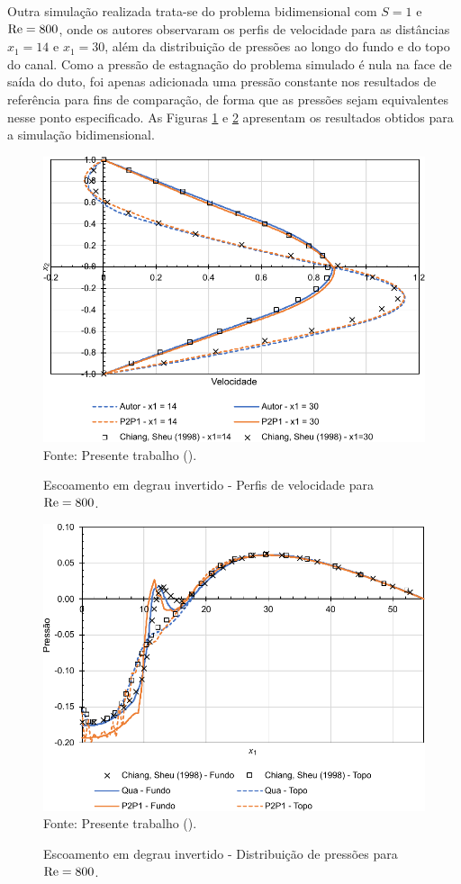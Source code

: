 Outra simulação realizada trata-se do problema bidimensional com $S=1$ e $\mathrm{Re}=800$, onde os autores observaram os perfis de velocidade para as distâncias $x_1=14$ e $x_1=30$, além da distribuição de pressões ao longo do fundo e do topo do canal. Como a pressão de estagnação do problema simulado é nula na face de saída do duto, foi apenas adicionada uma pressão constante nos resultados de referência para fins de comparação, de forma que as pressões sejam equivalentes nesse ponto especificado. As Figuras \ref{fig:BFS800-vel} e \ref{fig:BFS800-pre} apresentam os resultados obtidos para a simulação bidimensional.

\begin{figure}[h!]
    \centering
    \caption{Escoamento em degrau invertido - Perfis de velocidade para $\mathrm{Re}=800$.}
    \includegraphics[width=.6\linewidth]{Figuras/backwardFacingStep/resultado2D-2.pdf}
    \\Fonte: Presente trabalho (\the\year).
    \label{fig:BFS800-vel}
\end{figure}

\begin{figure}[h!]
    \centering
    \caption{Escoamento em degrau invertido - Distribuição de pressões para $\mathrm{Re}=800$.}
    \includegraphics[width=.6\linewidth]{Figuras/backwardFacingStep/resultado2D-1.pdf}
    \\Fonte: Presente trabalho (\the\year).
    \label{fig:BFS800-pre}
\end{figure}

